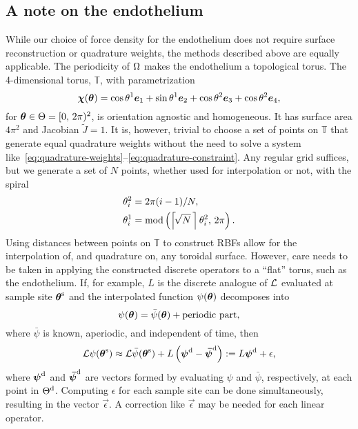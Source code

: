 \subsection{A note on the endothelium}
While our choice of force density for the endothelium does not require surface
reconstruction or quadrature weights, the methods described above are equally applicable.
The periodicity of $\Omega$ makes the endothelium a topological torus. The 4-dimensional
torus, $\mathbb{T}$, with parametrization
\begin{equation*}
    \Xp(\qs) = \cos\q[1]\e_1 + \sin\q[1]\e_2 + \cos\q[2]\e_3 + \cos\q[2]\e_4,
\end{equation*}
for $\boldsymbol{\theta}\in\Theta=[0,\,2\pi)^2$, is orientation agnostic and homogeneous. It has surface
area $4\pi^2$ and Jacobian $\tilde{J} = 1$. It is, however, trivial to choose a set of
points on $\mathbb{T}$ that generate equal quadrature weights without the need to solve a
system like~\eqref{eq:quadrature-weights}--\eqref{eq:quadrature-constraint}. Any regular
grid suffices, but we generate a set of $N$ points, whether used for interpolation or
not, with the spiral
\begin{align*}
    \q^2_i &= 2\pi (i-1)/N, \\
    \q^1_i &= \modulo\left(\left\lceil\!\sqrt{N}\mskip\thinmuskip\right\rceil\theta^2_i,\,2\pi\right).
\end{align*}
Using distances between points
on $\mathbb{T}$ to construct RBFs allow for the interpolation of, and quadrature on, any
toroidal surface. However, care needs to be taken in applying the constructed discrete
operators to a ``flat'' torus, such as the endothelium. If, for example, $L$ is the
discrete analogue of $\mathcal{L}$ evaluated at sample site ${\boldsymbol{\theta}}^\text{s}$ and the interpolated
function $\psi(\boldsymbol{\theta})$ decomposes into
\begin{equation*}
    \psi(\boldsymbol{\theta}) = \bar{\psi}(\boldsymbol{\theta}) + \text{periodic part},
\end{equation*}
where $\bar{\psi}$ is known, aperiodic, and independent of time, then
\begin{equation*}
    \mathcal{L}\psi({\boldsymbol{\theta}}^\text{s})
    \approx \mathcal{L}\bar{\psi}({\boldsymbol{\theta}}^\text{s}) + L\left({\boldsymbol{\psi}}^\text{d} - {\boldsymbol{\bar{\psi}}}^\text{d}\right)
    := L{\boldsymbol{\psi}}^\text{d} + \epsilon,
\end{equation*}
where ${\boldsymbol{\psi}}^\text{d}$ and ${\boldsymbol{\bar{\psi}}}^\text{d}$ are vectors formed by evaluating
$\psi$ and $\bar{\psi}$, respectively, at each point in ${\Theta}^\text{d}$. Computing
$\epsilon$ for each sample site can be done simultaneously, resulting in the vector
$\vec{\epsilon}$. A correction like $\vec{\epsilon}$ may be needed for each linear
operator.
